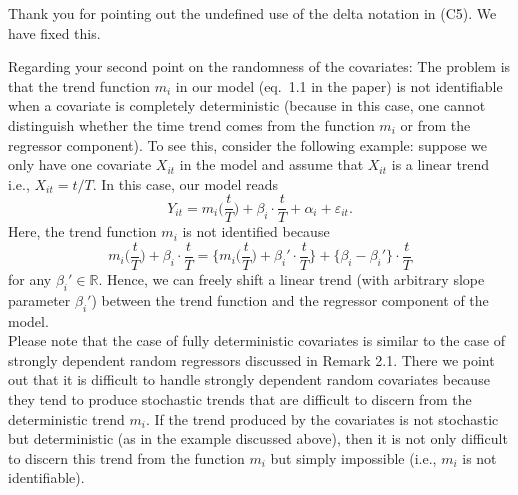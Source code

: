 \documentclass[a4paper,12pt]{article}
\begin{document}
\begin{enumerate}[label=\arabic*.,leftmargin=0.6cm]
Thank you for pointing out the undefined use of the delta notation in (C5). We have fixed this. 

Regarding your second point on the randomness of the covariates: The problem is that the trend function $m_i$ in our model (eq.\ 1.1 in the paper) is not identifiable when a covariate is completely deterministic (because in this case, one cannot distinguish whether the time trend comes from the function $m_i$ or from the regressor component). To see this, consider the following example: suppose we only have one covariate $X_{it}$ in the model and assume that $X_{it}$ is a linear trend i.e., $X_{it} = t/T$. In this case, our model reads
\[ Y_{it} = m_i\Big(\frac{t}{T}\Big) + \beta_i \cdot \frac{t}{T} + \alpha_i + \varepsilon_{it}. \]
Here, the trend function $m_i$ is not identified because 
\[ m_i\Big(\frac{t}{T}\Big) + \beta_i \cdot \frac{t}{T} = \Big\{ m_i\Big(\frac{t}{T}\Big) + \beta_i' \cdot \frac{t}{T} \Big\} + \big\{\beta_i - \beta_i'\big\} \cdot \frac{t}{T} \]
for any $\beta_i' \in \mathbb{R}$. Hence, we can freely shift a linear trend (with arbitrary slope parameter $\beta_i'$) between the trend function and the regressor component of the model. \\
Please note that the case of fully deterministic covariates is similar to the case of strongly dependent random regressors discussed in Remark 2.1. There we point out that it is difficult to handle strongly dependent random covariates because they tend to produce stochastic trends that are difficult to discern from the deterministic trend $m_i$. If the trend produced by the covariates is not stochastic but deterministic (as in the example discussed above), then it is not only difficult to discern this trend from the function $m_i$ but simply impossible (i.e., $m_i$ is not identifiable).




\end{enumerate}
\end{document}
